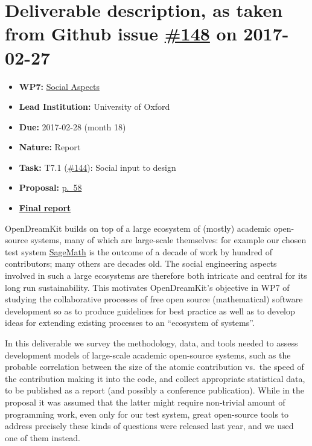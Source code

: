 \section*{\texorpdfstring{Deliverable description, as taken from Github
issue
\href{https://github.com/OpenDreamKit/OpenDreamKit/issues/148}{\#148} on
2017-02-27}
{Deliverable description, as taken from Github issue \#148 on 2017-02-27 \{.notoc\}\textbackslash{}n}}\label{deliverable-description-as-taken-from-github-issue-148-on-2017-02-27-.notocn}

\begin{itemize}
\tightlist
\item
  \textbf{WP7:}
  \href{https://github.com/OpenDreamKit/OpenDreamKit/tree/master/WP7}{Social
  Aspects}
\item
  \textbf{Lead Institution:} University of Oxford
\item
  \textbf{Due:} 2017-02-28 (month 18)
\item
  \textbf{Nature:} Report
\item
  \textbf{Task:} T7.1
  (\href{https://github.com/OpenDreamKit/OpenDreamKit/issues/144}{\#144}):
  Social input to design
\item
  \textbf{Proposal:}
  \href{https://github.com/OpenDreamKit/OpenDreamKit/raw/master/Proposal/proposal-www.pdf}{p.~58}
\item
  \textbf{\href{https://github.com/OpenDreamKit/OpenDreamKit/raw/master/WP7/D7.1/report-final.pdf}{Final
  report}}
\end{itemize}

OpenDreamKit builds on top of a large ecosystem of (mostly) academic
open-source systems, many of which are large-scale themselves: for
example our chosen test system \href{http://sagemath.org}{SageMath} is
the outcome of a decade of work by hundred of contributors; many others
are decades old. The social engineering aspects involved in such a large
ecosystems are therefore both intricate and central for its long run
sustainability. This motivates OpenDreamKit's objective in WP7 of
studying the collaborative processes of free open source (mathematical)
software development so as to produce guidelines for best practice as
well as to develop ideas for extending existing processes to an
``ecosystem of systems''.

In this deliverable we survey the methodology, data, and tools needed to
assess development models of large-scale academic open-source systems,
such as the probable correlation between the size of the atomic
contribution vs.~the speed of the contribution making it into the code,
and collect appropriate statistical data, to be published as a report
(and possibly a conference publication). While in the proposal it was
assumed that the latter might require non-trivial amount of programming
work, even only for our test system, great open-source tools to address
precisely these kinds of questions were released last year, and we used
one of them instead.

